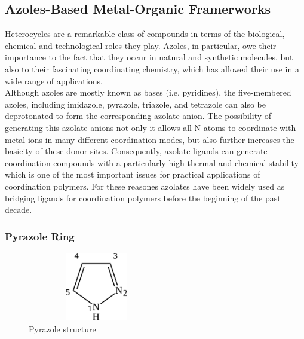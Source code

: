 \documentclass[../Master.tex]{subfiles}
\begin{document}



\subsection{Azoles-Based Metal-Organic Framerworks}\label{az-mof}
Heterocycles are a remarkable class of compounds in terms of the biological, chemical and technological roles they play. Azoles, in particular, owe their importance to the fact that they occur in natural and synthetic molecules, but also to their fascinating coordinating chemistry, which has allowed their use in a wide range of applications. \\
Although azoles are mostly known as bases (i.e. pyridines), the five-membered azoles, including imidazole, pyrazole, triazole, and tetrazole can also be deprotonated to form the corresponding azolate anion. The possibility of generating this azolate anions not only it allows all N atoms to coordinate with metal ions in many different coordination modes, but also further increases the basicity of these donor sites. Consequently, azolate ligands can generate coordination compounds with a particularly high thermal and chemical stability which is one of the most important issues for practical applications of coordination polymers.
For these reasones azolates have been widely used as bridging ligands for coordination polymers before the beginning of the past decade.
\subsubsection{Pyrazole Ring}
\begin{figure}[h]
	\centering
	\includegraphics[width=6cm,height=3cm,keepaspectratio]{Structures/pyrazole.eps}
	\caption{Pyrazole structure}\label{fig:pyrstc}
\end{figure}
\end{document}
